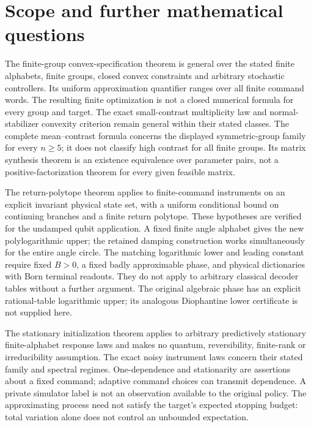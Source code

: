 \section{Scope and further mathematical questions}\label{sec:r73-scope}\label{sec:r74-scope}\label{sec:r75-scope}\label{sec:r76-scope}
The finite-group convex-specification theorem is general over the stated
finite alphabets, finite groups, closed convex constraints and arbitrary
stochastic controllers. Its uniform approximation quantifier ranges over
all finite command words. The resulting finite optimization is not a
closed numerical formula for every group and target. The exact
small-contrast multiplicity law and normal-stabilizer convexity criterion
remain general within their stated classes. The complete mean--contrast
formula concerns the displayed symmetric-group family for every $n\ge5$;
it does not classify high contrast for all finite groups. Its matrix
synthesis theorem is an existence equivalence over parameter pairs,
not a positive-factorization theorem for every given feasible matrix.

The return-polytope theorem applies to finite-command instruments on an
explicit invariant physical state set, with a uniform conditional bound
on continuing branches and a finite return polytope. These hypotheses
are verified for the undamped qubit application. A fixed finite angle
alphabet gives the new polylogarithmic upper; the retained damping
construction works simultaneously for the entire angle circle. The
matching logarithmic lower and leading constant require fixed $B>0$,
a fixed badly approximable phase, and physical dictionaries with Born
terminal readouts. They do not apply to arbitrary classical decoder
tables without a further argument. The original algebraic phase has an
explicit rational-table logarithmic upper; its analogous Diophantine
lower certificate is not supplied here.

The stationary initialization theorem applies to arbitrary predictively
stationary finite-alphabet response laws and makes no quantum,
reversibility, finite-rank or irreducibility assumption. The exact noisy
instrument laws concern their stated family and spectral regimes.
One-dependence and stationarity are assertions about a fixed command;
adaptive command choices can transmit dependence. A private simulator
label is not an observation available to the original policy. The
approximating process need not satisfy the target's expected stopping
budget: total variation alone does not control an unbounded expectation.

